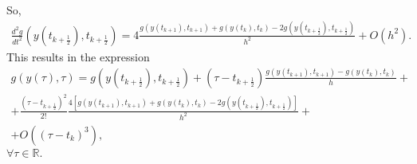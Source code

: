 \documentclass[letterpaper,10pt,english]{jupyterBook}
\begin{document}
\sphinxAtStartPar
So,
\begin{equation*}
\begin{split}
  \frac{d^2g}{dt^2} \left(y\left(t_{k+\frac{1}{2}}\right), t_{k+\frac{1}{2}}\right) =
  4\frac{ g(y(t_{k+1}), t_{k+1}) + g(y(t_k), t_k) -
  2 g\left(y\left(t_{k+\frac{1}{2}}\right), t_{k+\frac{1}{2}}\right)}{h^2}
  + O(h^2).
\end{split}
\end{equation*}
\sphinxAtStartPar
This results in the expression
\begin{equation*}
\begin{split}
    g(y(\tau), \tau) = g\left(y\left(t_{k+\frac{1}{2}}\right), t_{k+\frac{1}{2}}\right) +
    \left(\tau - t_{k+\frac{1}{2}}\right)  \frac{g(y(t_{k+1}), t_{k+1}) - g(y(t_k), t_k)}{h} + \\
    + \frac{\left(\tau - t_{k+\frac{1}{2}}\right)^2}{2!} \frac{ 4 \left[g(y(t_{k+1}), t_{k+1}) + g(y(t_k), t_k) -
  2 g\left(y\left(t_{k+\frac{1}{2}}\right), t_{k+\frac{1}{2}}\right) \right]}{h^2} + \\
    + O((\tau - t_k)^3),
\end{split}
\end{equation*}
\sphinxAtStartPar
\(\forall \tau \in \mathbb{R}.\)
\end{document}
